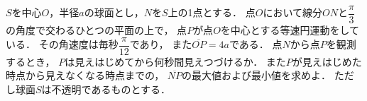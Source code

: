 \documentclass[../../main.tex]{subfiles}
\begin{document}
$S$を中心$O$，半径$a$の球面とし，$N$を$S$上の1点とする．
点$O$において線分$ON$と$\displaystyle\dfrac{\pi}{3}$の角度で交わるひとつの平面の上で，
点$P$が点$O$を中心とする等速円運動をしている．
その角速度は毎秒$\displaystyle\dfrac{\pi}{12}$であり，
また$\overline{OP}=4a$である．
点$N$から点$P$を観測するとき，
$P$は見えはじめてから何秒間見えつづけるか．
また$P$が見えはじめた時点から見えなくなる時点までの，
$\overline{NP}$の最大値および最小値を求めよ．
ただし球面$S$は不透明であるものとする．
\end{document}
